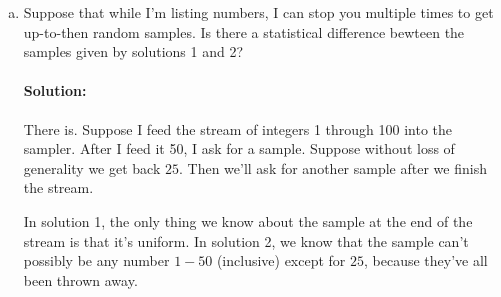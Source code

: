 \documentclass{article}
\begin{document}
\begin{enumerate}[1.]
\begin{enumerate}[a.]
    For time, you should note that it is possible to maintain a collection of
    $k$ numbers using $O(k)$ space\footnote{I'm making the simplifying
      assumption here that it takes $O(1)$---that is, constant---space to write
      down a number.} such that it costs:
    \begin{itemize}
    \item $O(1)$ time to find the maximum
    \item $O(\log k)$ time to remove the maximum
    \item $O(\log k)$ time to add a new item to the collection.
      \footnote{\label{note:heap}This can be done by arranging the $k$ elements into a data structure called a binary heap.}
    \end{itemize}

    \paragraph{Solution:} We'll want to track the numbers with the $k$ smallest
    tags. To do so, we'll store the first $k$ numbers in our max-heap (see
    \cref{note:heap}). Whenever we get a new number, we'll generate a tag. If
    the tag is smaller than the maximum in our heap, it must be one of the
    $k$ smallest we've seen, so we'll remove the maximum from the heap and add
    our new number to the heap.

    For each new number, it only costs us $O(1)$ to generate the tag and lookup
    the maximum in our heap. If we have to put out new element into the heap,
    it'll cost us $O(\log k)$. Space-wise, the only storage we have is the heap,
    so we use $O(k)$ space.

  \item %
    Suppose that while I'm listing numbers, I can stop you multiple times to get
    up-to-then random samples. Is there a statistical difference bewteen the
    samples given by solutions 1 and 2?

    \paragraph{Solution:} There is. Suppose I feed the stream of integers 1
    through 100 into the sampler. After I feed it 50, I ask for a sample.
    Suppose without loss of generality we get back $25$. Then we'll ask for
    another sample after we finish the stream.

    In solution 1, the only thing we know about the sample at the end of the
    stream is that it's uniform. In solution 2, we know that the sample can't
    possibly be any number $1-50$ (inclusive) except for $25$, because they've
    all been thrown away.
  \end{enumerate}


\end{enumerate}
\end{document}
